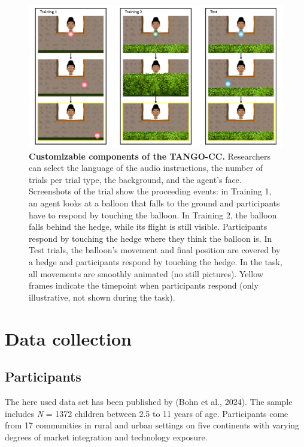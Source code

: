 \documentclass[
  man,mask,floatsintext]{apa7}
\begin{document}
\begin{figure}

{\centering \includegraphics[width=1\linewidth]{../figures/tango-cc-procedure} 

}

\caption{\textbf{Customizable components of the TANGO-CC.} Researchers can select the language of the audio instructions, the number of trials per trial type, the background, and the agent's face. Screenshots of the trial show the proceeding events: in Training 1, an agent looks at a balloon that falls to the ground and participants have to respond by touching the balloon. In Training 2, the balloon falls behind the hedge, while its flight is still visible. Participants respond by touching the hedge where they think the balloon is. In Test trials, the balloon's movement and final position are covered by a hedge and participants respond by touching the hedge. In the task, all movements are smoothly animated (no still pictures). Yellow frames indicate the timepoint when participants respond (only illustrative, not shown during the task).}\label{fig:fig1}
\end{figure}

\hypertarget{data-collection}{%
\section{Data collection}\label{data-collection}}

\hypertarget{participants}{%
\subsection{Participants}\label{participants}}

The here used data set has been published by (Bohn et al., 2024). The sample includes \emph{N} = 1372 children between 2.5 to 11 years of age. Participants come from 17 communities in rural and urban settings on five continents with varying degrees of market integration and technology exposure.
\end{document}
